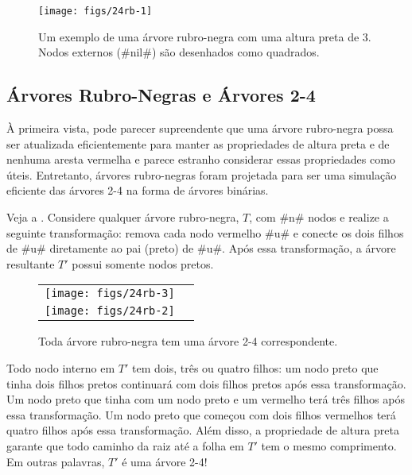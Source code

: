 \begin{figure}
  \begin{center}
    \texttt{[image: figs/24rb-1]}
  \end{center}
  \caption[Uma árvore rubro-negra]{Um exemplo de uma árvore rubro-negra com uma altura preta de 3. Nodos externos (#nil#) são desenhados como quadrados.}
\end{figure}


\subsection{Árvores Rubro-Negras e Árvores 2-4}

À primeira vista, pode parecer supreendente que uma árvore rubro-negra possa
ser atualizada eficientemente para manter as propriedades de altura preta e de 
nenhuma aresta vermelha e parece estranho considerar essas propriedades como úteis.
Entretanto, árvores rubro-negras foram projetada para ser uma simulação eficiente das árvores 2-4 na forma de árvores binárias.

Veja a .
Considere qualquer árvore rubro-negra, $T$, com #n# nodos e realize a seguinte transformação: remova cada nodo vermelho #u# e conecte os dois filhos de #u# diretamente ao pai (preto) de #u#.
Após essa transformação, a árvore resultante $T'$ possui somente nodos pretos.
\begin{figure}
  \begin{center}
    \begin{tabular}{cc}
      \texttt{[image: figs/24rb-3]} \\
      \texttt{[image: figs/24rb-2]}
    \end{tabular}
  \end{center}
  \caption{Toda árvore rubro-negra tem uma árvore 2-4 correspondente.}
\end{figure}

Todo nodo interno em $T'$ tem dois, três ou quatro filhos: um nodo preto 
que tinha dois filhos pretos continuará com
dois filhos pretos após essa transformação.
Um nodo preto que tinha com um nodo preto e um vermelho terá três
filhos após essa transformação.
Um nodo preto que começou com dois filhos vermelhos terá quatro filhos após
essa transformação. Além disso, a propriedade de altura preta garante
que todo caminho da raiz até a folha em $T'$ tem o mesmo comprimento.
Em outras palavras, $T'$ é uma 
árvore 2-4!

